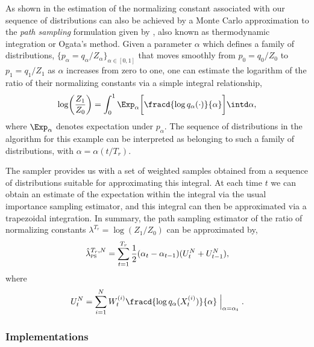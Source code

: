 \documentclass[11pt, fontset=Minion, showoverfull,
bib, mintcode, minted=cache]{marticle}
\begin{document}
As shown in \textcite{Zhou2013mc} the estimation of the normalizing constant
associated with our sequence of distributions can also be achieved by a Monte
Carlo approximation to the \emph{path sampling} formulation given by
\textcite{Gelman:1998ei}, also known as thermodynamic integration or Ogata's
method. Given a parameter $\alpha$ which defines a family of distributions,
$\{p_{\alpha} = q_{\alpha} / Z_\alpha\}_{\alpha \in [0,1]}$ that moves
smoothly from $p_0 = q_0 / Z_0$ to $p_1 = q_1 / Z_1$ as $\alpha$ increases
from zero to one, one can estimate the logarithm of the ratio of their
normalizing constants via a simple integral relationship,
\begin{equation}
  \log\biggl( \frac{Z_1}{Z_0} \biggr) =
  \int_{0}^{1} \Exp_\alpha \biggl[ \fracd{\log q_{\alpha}(\cdot)}{\alpha}
  \biggr] \intd\alpha, \label{eq:path_identity}
\end{equation}
where $\Exp_\alpha$ denotes expectation under $p_\alpha$. The sequence of
distributions in the \smc algorithm for this example can be interpreted as
belonging to such a family of distributions, with $\alpha = \alpha(t/T_r)$.

The \smc sampler provides us with a set of weighted samples obtained from a
sequence of distributions suitable for approximating this integral. At each
time $t$ we can obtain an estimate of the expectation within the integral via
the usual importance sampling estimator, and this integral can then be
approximated via a trapezoidal integration. In summary, the path sampling
estimator of the ratio of normalizing constants $\lambda^{T_r} =
\log(Z_1/Z_0)$ can be approximated by,
\begin{equation}
  \hat\lambda_{\text{\textsc{ps}}}^{T_r,N} = \sum_{t=1}^{T_r}
  \frac{1}{2}(\alpha_t - \alpha_{t - 1})(U_t^N + U_{t-1}^N),
  \label{eq:path_est}
\end{equation}
where
\begin{equation}
  U_t^N = \sum_{i=1}^N
  W_t^{(i)} \fracd{\log q_{\alpha}(X_t^{(i)})}{\alpha}
  \Bigm|_{\alpha = \alpha_t}.
  \label{eq:path_import}
\end{equation}

\subsubsection{Implementations}
\end{document}
